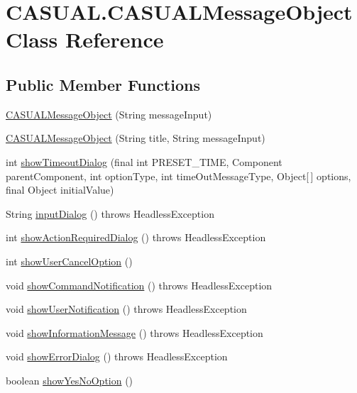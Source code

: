 \hypertarget{classCASUAL_1_1CASUALMessageObject}{\section{C\-A\-S\-U\-A\-L.\-C\-A\-S\-U\-A\-L\-Message\-Object Class Reference}
\label{classCASUAL_1_1CASUALMessageObject}
}
\subsection*{Public Member Functions}
\begin{DoxyCompactItemize}
\item 
\hyperlink{classCASUAL_1_1CASUALMessageObject_ae826dde1386a7040749cc429e40400b5}{C\-A\-S\-U\-A\-L\-Message\-Object} (String message\-Input)
\item 
\hyperlink{classCASUAL_1_1CASUALMessageObject_a92b199db10f96ecbc9be1b26344e82b6}{C\-A\-S\-U\-A\-L\-Message\-Object} (String title, String message\-Input)
\item 
int \hyperlink{classCASUAL_1_1CASUALMessageObject_a7f6babfe3c0458a49081c12b31593e11}{show\-Timeout\-Dialog} (final int P\-R\-E\-S\-E\-T\-\_\-\-T\-I\-M\-E, Component parent\-Component, int option\-Type, int time\-Out\-Message\-Type, Object\mbox{[}$\,$\mbox{]} options, final Object initial\-Value)
\item 
String \hyperlink{classCASUAL_1_1CASUALMessageObject_a044a50f100490ac815197597bc2b0cc3}{input\-Dialog} ()  throws Headless\-Exception 
\item 
int \hyperlink{classCASUAL_1_1CASUALMessageObject_a94d3197760f77cdbd6b60fbf874976bc}{show\-Action\-Required\-Dialog} ()  throws Headless\-Exception 
\item 
int \hyperlink{classCASUAL_1_1CASUALMessageObject_acacbc59bd2fcd53f7746d8e8966377a5}{show\-User\-Cancel\-Option} ()
\item 
void \hyperlink{classCASUAL_1_1CASUALMessageObject_af1731a686ae654acc68823c3249bbd1c}{show\-Command\-Notification} ()  throws Headless\-Exception 
\item 
void \hyperlink{classCASUAL_1_1CASUALMessageObject_a10b91cd75cc6620e93b546d19cbcf995}{show\-User\-Notification} ()  throws Headless\-Exception 
\item 
void \hyperlink{classCASUAL_1_1CASUALMessageObject_abf3fa13e8cf477d6e74bd1c7846e04c9}{show\-Information\-Message} ()  throws Headless\-Exception 
\item 
void \hyperlink{classCASUAL_1_1CASUALMessageObject_aefd0003f0c1f298da3f5af1107384d2c}{show\-Error\-Dialog} ()  throws Headless\-Exception 
\item 
boolean \hyperlink{classCASUAL_1_1CASUALMessageObject_a1c209c028596425d20c826173586222c}{show\-Yes\-No\-Option} ()
\end{DoxyCompactItemize}
